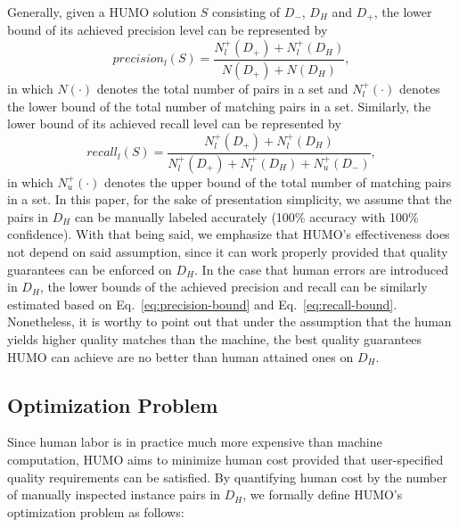   Generally, given a HUMO solution $S$ consisting of $D_-$, $D_H$ and $D_+$, the lower bound of its achieved precision level can be represented by
\begin{equation}
   precision_l(S)=\frac{N^+_l(D_+)+N^+_l(D_H)}{N(D_+)+N(D_H)},
\label{eq:precision-bound}
\end{equation}
in which $N(\cdot)$ denotes the total number of pairs in a set and $N^+_l(\cdot)$ denotes the lower bound of the total number of matching pairs in a set. Similarly, the lower bound of its achieved recall level can be represented by
\begin{equation}
  recall_l(S)=\frac{N^+_l(D_+)+N^+_l(D_H)}{N^+_l(D_+)+N^+_l(D_H)+N^+_u(D_-)},
\label{eq:recall-bound}
\end{equation}
in which $N^+_u(\cdot)$ denotes the upper bound of the total number of matching pairs in a set. In this paper, for the sake of presentation simplicity, we assume that the pairs in $D_H$ can be manually labeled accurately (100\% accuracy with 100\% confidence). With that being said, we emphasize that HUMO's effectiveness does not depend on said assumption, since it can work properly provided that quality guarantees can be enforced on $D_H$. In the case that human errors are introduced in $D_H$, the lower bounds of the achieved precision and recall can be similarly estimated based on Eq.~\ref{eq:precision-bound} and Eq.~\ref{eq:recall-bound}. Nonetheless, it is worthy to point out that under the assumption that the human yields higher quality matches than the machine, the best quality guarantees HUMO can achieve are no better than human attained ones on $D_H$.


\subsection{Optimization Problem}

  Since human labor is in practice much more expensive than machine computation, HUMO aims to minimize human cost provided that user-specified quality requirements can be satisfied. By quantifying human cost by the number of manually inspected instance pairs in $D_H$, we formally define HUMO's optimization problem as follows:

